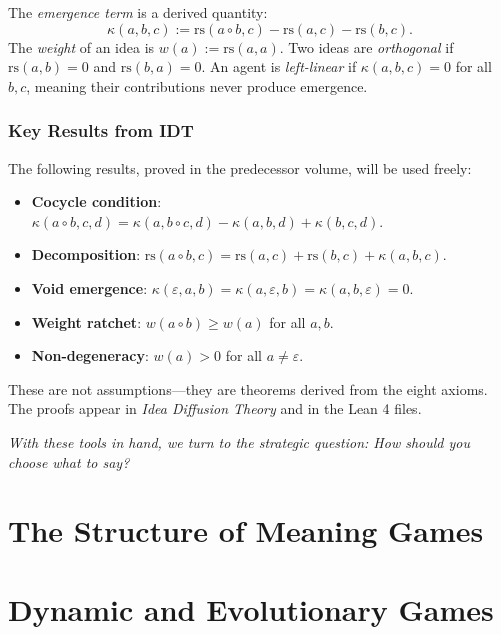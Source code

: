 \documentclass[11pt,oneside]{book}
\theoremstyle{plain}
\theoremstyle{definition}
\theoremstyle{remark}
\newcommand{\rs}{\mathrm{rs}}
\newcommand{\emerge}{\kappa}
\newcommand{\compose}{\circ}
\newcommand{\void}{\varepsilon}
\begin{document}
The \emph{emergence term} is a derived quantity:
\[
\emerge(a, b, c) := \rs(a \compose b, c) - \rs(a, c) - \rs(b, c).
\]
The \emph{weight} of an idea is $w(a) := \rs(a, a)$.
Two ideas are \emph{orthogonal} if $\rs(a, b) = 0$ and $\rs(b, a) = 0$.
An agent is \emph{left-linear} if $\emerge(a, b, c) = 0$ for all $b, c$,
meaning their contributions never produce emergence.

\section*{Key Results from IDT}

The following results, proved in the predecessor volume, will be used freely:

\begin{itemize}
\item \textbf{Cocycle condition}: $\emerge(a \compose b, c, d) = \emerge(a, b \compose c, d) - \emerge(a, b, d) + \emerge(b, c, d)$.
\item \textbf{Decomposition}: $\rs(a \compose b, c) = \rs(a, c) + \rs(b, c) + \emerge(a, b, c)$.
\item \textbf{Void emergence}: $\emerge(\void, a, b) = \emerge(a, \void, b) = \emerge(a, b, \void) = 0$.
\item \textbf{Weight ratchet}: $w(a \compose b) \geq w(a)$ for all $a, b$.
\item \textbf{Non-degeneracy}: $w(a) > 0$ for all $a \neq \void$.
\end{itemize}

These are not assumptions---they are theorems derived from the eight axioms.
The proofs appear in \emph{Idea Diffusion Theory} and in the Lean 4 files.

\vspace{1em}
\noindent\textit{With these tools in hand, we turn to the strategic question:
How should you choose what to say?}

\part{The Structure of Meaning Games}



\part{Dynamic and Evolutionary Games}
\end{document}
